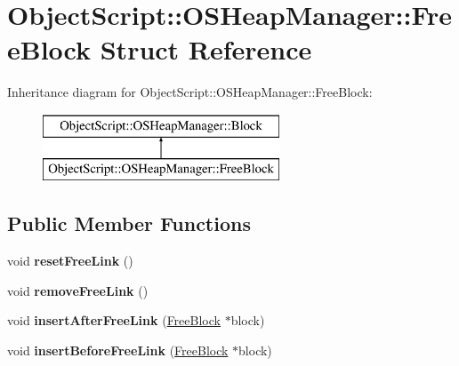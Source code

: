 \hypertarget{struct_object_script_1_1_o_s_heap_manager_1_1_free_block}{}\section{Object\+Script\+:\+:O\+S\+Heap\+Manager\+:\+:Free\+Block Struct Reference}
\label{struct_object_script_1_1_o_s_heap_manager_1_1_free_block}
Inheritance diagram for Object\+Script\+:\+:O\+S\+Heap\+Manager\+:\+:Free\+Block\+:\begin{figure}[H]
\begin{center}
\leavevmode
\includegraphics[height=2.000000cm]{struct_object_script_1_1_o_s_heap_manager_1_1_free_block}
\end{center}
\end{figure}
\subsection*{Public Member Functions}
\begin{DoxyCompactItemize}
\item 
void {\bfseries reset\+Free\+Link} ()\hypertarget{struct_object_script_1_1_o_s_heap_manager_1_1_free_block_a8dae15255548a11461fc313473bea132}{}\label{struct_object_script_1_1_o_s_heap_manager_1_1_free_block_a8dae15255548a11461fc313473bea132}

\item 
void {\bfseries remove\+Free\+Link} ()\hypertarget{struct_object_script_1_1_o_s_heap_manager_1_1_free_block_a3d7405c41754785cfe0b542fbd2b254f}{}\label{struct_object_script_1_1_o_s_heap_manager_1_1_free_block_a3d7405c41754785cfe0b542fbd2b254f}

\item 
void {\bfseries insert\+After\+Free\+Link} (\hyperlink{struct_object_script_1_1_o_s_heap_manager_1_1_free_block}{Free\+Block} $\ast$block)\hypertarget{struct_object_script_1_1_o_s_heap_manager_1_1_free_block_a4ed9645c540f43e39b9fe987b88bbca6}{}\label{struct_object_script_1_1_o_s_heap_manager_1_1_free_block_a4ed9645c540f43e39b9fe987b88bbca6}

\item 
void {\bfseries insert\+Before\+Free\+Link} (\hyperlink{struct_object_script_1_1_o_s_heap_manager_1_1_free_block}{Free\+Block} $\ast$block)\hypertarget{struct_object_script_1_1_o_s_heap_manager_1_1_free_block_a8e7c87cfadb5ecf73af0eefed1be1904}{}\label{struct_object_script_1_1_o_s_heap_manager_1_1_free_block_a8e7c87cfadb5ecf73af0eefed1be1904}

\end{DoxyCompactItemize}
